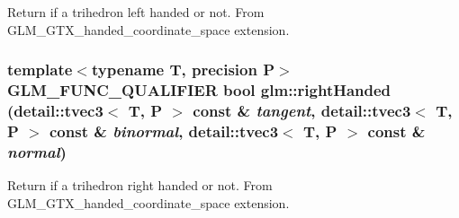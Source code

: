 Return if a trihedron left handed or not. From GLM\_\-GTX\_\-handed\_\-coordinate\_\-space extension. \hypertarget{group__gtx__handed__coordinate__space_g65f766ab3c8924b90eabc0e1ecf014d1}{
\subsubsection[rightHanded]{\setlength{\rightskip}{0pt plus 5cm}template$<$typename T, precision P$>$ GLM\_\-FUNC\_\-QUALIFIER bool glm::rightHanded (detail::tvec3$<$ T, P $>$ const \& {\em tangent}, \/  detail::tvec3$<$ T, P $>$ const \& {\em binormal}, \/  detail::tvec3$<$ T, P $>$ const \& {\em normal})}}
\label{group__gtx__handed__coordinate__space_g65f766ab3c8924b90eabc0e1ecf014d1}


Return if a trihedron right handed or not. From GLM\_\-GTX\_\-handed\_\-coordinate\_\-space extension. 